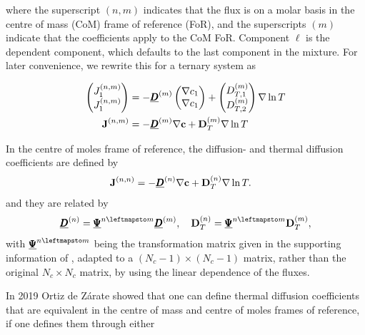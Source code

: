 where the superscript $(n, m)$ indicates that the flux is on a molar basis in the centre of mass (CoM) frame of reference (FoR), and the superscripts $(m)$ indicate that the coefficients apply to the CoM FoR. Component $\ell$ is the dependent component, which defaults to the last component in the mixture. For later convenience, we rewrite this for a ternary system as

\begin{equation}
    \begin{split}
        \begin{pmatrix}J_1^{(n,m)} \\ J_1^{(n,m)} \end{pmatrix} &= - \underline{\pmb{D}}^{(m)} \begin{pmatrix} \nabla c_1 \\ \nabla c_1 \end{pmatrix} + \begin{pmatrix} D_{T,1}^{(m)} \\ D_{T,2}^{(m)} \end{pmatrix} \nabla \ln T\\
        \boldsymbol{\mathrm{J}}^{(n, m)} &= - \underline{\pmb{D}}^{(m)} \nabla \boldsymbol{\mathrm{c}} + \boldsymbol{\mathrm{D}}_T^{(m)} \nabla \ln T
    \end{split}
    \label{eq:Dtm_def}
\end{equation}

In the centre of moles frame of reference, the diffusion- and thermal diffusion coefficients are defined by
\begin{equation}
    \begin{split}
        \boldsymbol{\mathrm{J}}^{(n, n)} &= - \underline{\pmb{D}}^{(n)} \nabla \boldsymbol{\mathrm{c}} + \boldsymbol{\mathrm{D}}_T^{(n)} \nabla \ln T.
    \end{split}
    \label{eq:DTn_def}
\end{equation}
and they are related by
\begin{equation}
    \Mat{D}^{(n)} = \Mat{\Psi}^{n \leftmapsto m} \Mat{D}^{(m)}, \quad \Vec{D}_T^{(n)} = \Mat{\Psi}^{n \leftmapsto m} \Vec{D}_T^{(m)},
\end{equation}
with $\Mat{\Psi}^{n \leftmapsto m}$ being the transformation matrix given in the supporting information of \cite{retmie}, adapted to a $(N_c - 1) \times (N_c - 1)$ matrix, rather than the original $N_c \times N_c$ matrix, by using the linear dependence of the fluxes.

In 2019 Ortiz de Zárate \cite{ortiz2019definition} showed that one can define thermal diffusion coefficients that are equivalent in the centre of mass and centre of moles frames of reference, if one defines them through either

